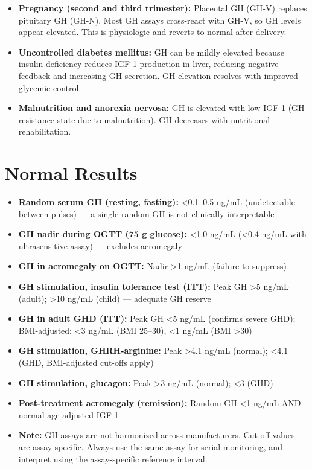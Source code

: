 \begin{itemize}
  \item \textbf{Pregnancy (second and third trimester):} Placental GH (GH-V) replaces pituitary GH (GH-N). Most GH assays cross-react with GH-V, so GH levels appear elevated. This is physiologic and reverts to normal after delivery.
  \item \textbf{Uncontrolled diabetes mellitus:} GH can be mildly elevated because insulin deficiency reduces IGF-1 production in liver, reducing negative feedback and increasing GH secretion. GH elevation resolves with improved glycemic control.
  \item \textbf{Malnutrition and anorexia nervosa:} GH is elevated with low IGF-1 (GH resistance state due to malnutrition). GH decreases with nutritional rehabilitation.
\end{itemize}

\section*{Normal Results}
\begin{itemize}
  \item \textbf{Random serum GH (resting, fasting):} <0.1--0.5 ng/mL (undetectable between pulses) --- a single random GH is not clinically interpretable
  \item \textbf{GH nadir during OGTT (75 g glucose):} <1.0 ng/mL (<0.4 ng/mL with ultrasensitive assay) --- excludes acromegaly
  \item \textbf{GH in acromegaly on OGTT:} Nadir >1 ng/mL (failure to suppress)
  \item \textbf{GH stimulation, insulin tolerance test (ITT):} Peak GH >5 ng/mL (adult); >10 ng/mL (child) --- adequate GH reserve
  \item \textbf{GH in adult GHD (ITT):} Peak GH <5 ng/mL (confirms severe GHD); BMI-adjusted: <3 ng/mL (BMI 25--30), <1 ng/mL (BMI >30)
  \item \textbf{GH stimulation, GHRH-arginine:} Peak >4.1 ng/mL (normal); <4.1 (GHD, BMI-adjusted cut-offs apply)
  \item \textbf{GH stimulation, glucagon:} Peak >3 ng/mL (normal); <3 (GHD)
  \item \textbf{Post-treatment acromegaly (remission):} Random GH <1 ng/mL AND normal age-adjusted IGF-1
  \item \textbf{Note:} GH assays are not harmonized across manufacturers. Cut-off values are assay-specific. Always use the same assay for serial monitoring, and interpret using the assay-specific reference interval.
\end{itemize}

